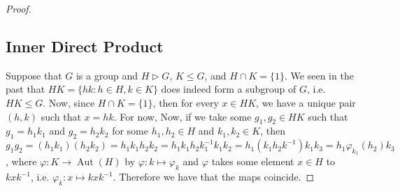 \documentclass[9pt,reqno]{amsart}
\theoremstyle{definition}
\DeclareMathOperator{\aut}{Aut}
\newcommand{\lmt}{\longmapsto}
\begin{document}
\begin{proof}
\subsection{Inner Direct Product} 
Suppose that $G$ is a group and $H \triangleright G$, $K \leq G$, and $H \cap K = \{ 1 \}$. We seen in the past that $HK = \{ hk \colon h \in H, k \in K \}$ does indeed form a subgroup of $G$, i.e. $HK \leq G$. Now, since $H \cap K = \{ 1 \}$, then for every $x \in HK$, we have a unique pair $(h, k)$ such that $x = hk$. For now, Now, if we take some $g_1, g_2 \in HK$ such that $g_1 = h_1 k_1$ and $g_2 = h_2 k_2$ for some $h_1, h_2 \in H$ and $k_1, k_2 \in K$, then $g_1 g_2 = (h_1 k_1) (h_2 k_2) = h_1 k_1 h_2 k_2 = h_1 k_1 h_2 k_1 ^{-1} k_1 k_2 = h_1 (k_1 h_2 k^{-1}) k_1 k_3 = h_1 \varphi_{k_1} (h_2) k_3$, where $\varphi \colon K \longrightarrow \aut (H)$ by $ \varphi \colon k \longmapsto \varphi_k$ and $\varphi$ takes some element $x \in H$ to $kxk^{-1}$, i.e. $\varphi_k  \colon x \lmt kxk^{-1}$. Therefore we have that the maps coincide. 


\end{proof}
\end{document}
